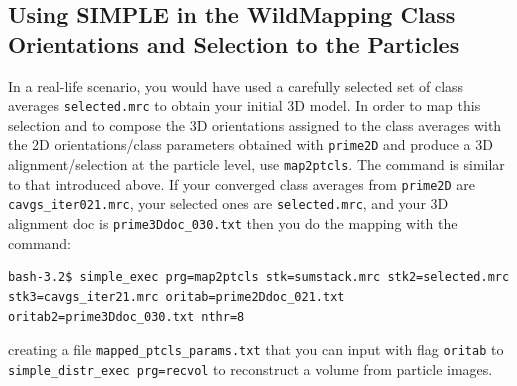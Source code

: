 \documentclass[a4paper,11pt]{article}
\newcommand{\prgname}[1]{\textcolor{NavyBlue}{\texttt{#1}}}
\begin{document}
\begin{tcolorbox}[breakable,colback=white,colframe=orange,width=\dimexpr\textwidth+12mm\relax,enlarge left by=-6mm]
\subsection{Using SIMPLE in the Wild\textemdash{}Mapping Class Orientations and Selection to the Particles}
In a real-life scenario, you would have used a carefully selected set of class averages \texttt{selected.mrc} to obtain your initial 3D model. In order to map this selection and to compose the 3D orientations assigned to the class averages with the 2D orientations/class parameters obtained with \prgname{prime2D} and produce a 3D alignment/selection at the particle level, use \prgname{map2ptcls}. The command is similar to that introduced above. If your converged class averages from \prgname{prime2D} are \texttt{cavgs\_iter021.mrc}, your selected ones are \texttt{selected.mrc}, and your 3D alignment doc is \texttt{prime3Ddoc\_030.txt} then you do the mapping with the command:
\begin{verbatim}
bash-3.2$ simple_exec prg=map2ptcls stk=sumstack.mrc stk2=selected.mrc
stk3=cavgs_iter21.mrc oritab=prime2Ddoc_021.txt oritab2=prime3Ddoc_030.txt nthr=8
\end{verbatim}
creating a file \texttt{mapped\_ptcls\_params.txt} that you can input with flag \texttt{oritab} to \texttt{simple\_distr\_exec prg=recvol} to reconstruct a volume from particle images.
\end{tcolorbox}



\end{document}
